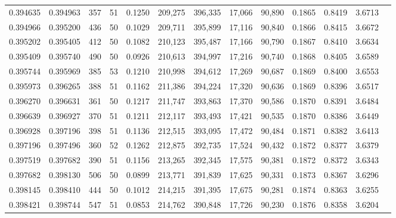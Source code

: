 \begin{tabular}{rrrrrrrrrrrrr}
0.394635 & 0.394963 &   357 &  51 &                                     0.1250 & 209,275 & 396,335 &  17,066 &  90,890 & 0.1865 & 0.8419 & 3.6713 \\
0.394966 & 0.395200 &   436 &  50 &                                     0.1029 & 209,711 & 395,899 &  17,116 &  90,840 & 0.1866 & 0.8415 & 3.6672 \\
0.395202 & 0.395405 &   412 &  50 &                                     0.1082 & 210,123 & 395,487 &  17,166 &  90,790 & 0.1867 & 0.8410 & 3.6634 \\
0.395409 & 0.395740 &   490 &  50 &                                     0.0926 & 210,613 & 394,997 &  17,216 &  90,740 & 0.1868 & 0.8405 & 3.6589 \\
0.395744 & 0.395969 &   385 &  53 &                                     0.1210 & 210,998 & 394,612 &  17,269 &  90,687 & 0.1869 & 0.8400 & 3.6553 \\
0.395973 & 0.396265 &   388 &  51 &                                     0.1162 & 211,386 & 394,224 &  17,320 &  90,636 & 0.1869 & 0.8396 & 3.6517 \\
0.396270 & 0.396631 &   361 &  50 &                                     0.1217 & 211,747 & 393,863 &  17,370 &  90,586 & 0.1870 & 0.8391 & 3.6484 \\
0.396639 & 0.396927 &   370 &  51 &                                     0.1211 & 212,117 & 393,493 &  17,421 &  90,535 & 0.1870 & 0.8386 & 3.6449 \\
0.396928 & 0.397196 &   398 &  51 &                                     0.1136 & 212,515 & 393,095 &  17,472 &  90,484 & 0.1871 & 0.8382 & 3.6413 \\
0.397196 & 0.397496 &   360 &  52 &                                     0.1262 & 212,875 & 392,735 &  17,524 &  90,432 & 0.1872 & 0.8377 & 3.6379 \\
0.397519 & 0.397682 &   390 &  51 &                                     0.1156 & 213,265 & 392,345 &  17,575 &  90,381 & 0.1872 & 0.8372 & 3.6343 \\
0.397682 & 0.398130 &   506 &  50 &                                     0.0899 & 213,771 & 391,839 &  17,625 &  90,331 & 0.1873 & 0.8367 & 3.6296 \\
0.398145 & 0.398410 &   444 &  50 &                                     0.1012 & 214,215 & 391,395 &  17,675 &  90,281 & 0.1874 & 0.8363 & 3.6255 \\
0.398421 & 0.398744 &   547 &  51 &                                     0.0853 & 214,762 & 390,848 &  17,726 &  90,230 & 0.1876 & 0.8358 & 3.6204 \\

\end{tabular}
